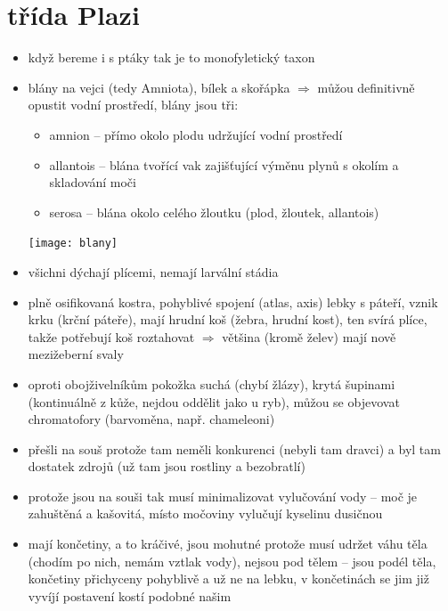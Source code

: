 \documentclass{article}
\begin{document}
\section{třída Plazi}
\begin{itemize}
  \item když bereme i s ptáky tak je to monofyletický taxon
  \item blány na vejci (tedy Amniota), bílek a skořápka $\Rightarrow$ můžou definitivně opustit vodní prostředí, blány jsou tři:
  \begin{minipage}{0.8\textwidth}
    \begin{itemize}
      \item amnion -- přímo okolo plodu udržující vodní prostředí
      \item allantois -- blána tvořící vak zajišťující výměnu plynů s okolím a skladování moči
      \item serosa -- blána okolo celého žloutku (plod, žloutek, allantois)
    \end{itemize}
  \end{minipage}
  \hfill
  \noindent\begin{minipage}{0.2\textwidth}
      \texttt{[image: blany]}
  \end{minipage}
  \item všichni dýchají plícemi, nemají larvální stádia
  \item plně osifikovaná kostra, pohyblivé spojení (atlas, axis) lebky s páteří, vznik krku (krční páteře), mají hrudní koš (žebra, hrudní kost), ten svírá plíce, takže potřebují koš roztahovat $\Rightarrow$ většina (kromě želev) mají nově mezižeberní svaly
  \item oproti obojživelníkům pokožka suchá (chybí žlázy), krytá šupinami (kontinuálně z kůže, nejdou oddělit jako u ryb), můžou se objevovat chromatofory (barvoměna, např. chameleoni)
  \item přešli na souš protože tam neměli konkurenci (nebyli tam dravci) a byl tam dostatek zdrojů (už tam jsou rostliny a bezobratlí)
  \item protože jsou na souši tak musí minimalizovat vylučování vody -- moč je zahuštěná a kašovitá, místo močoviny vylučují kyselinu dusičnou
  \item mají končetiny, a to kráčivé, jsou mohutné protože musí udržet váhu těla (chodím po nich, nemám vztlak vody), nejsou pod tělem -- jsou podél těla, končetiny přichyceny pohyblivě a už ne na lebku, v končetinách se jim již vyvíjí postavení kostí podobné našim
  \begin{itemize}

\end{itemize}
\end{itemize}
\end{document}
